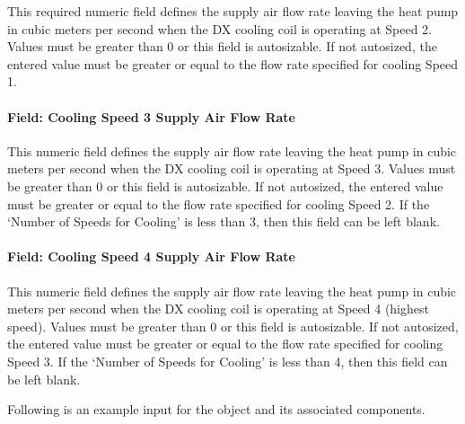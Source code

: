 This required numeric field defines the supply air flow rate leaving the heat pump in cubic meters per second when the DX cooling coil is operating at Speed 2. Values must be greater than 0 or this field is autosizable. If not autosized, the entered value must be greater or equal to the flow rate specified for cooling Speed 1.

\paragraph{Field: Cooling Speed 3 Supply Air Flow Rate}\label{field-cooling-speed-3-supply-air-flow-rate}

This numeric field defines the supply air flow rate leaving the heat pump in cubic meters per second when the DX cooling coil is operating at Speed 3. Values must be greater than 0 or this field is autosizable. If not autosized, the entered value must be greater or equal to the flow rate specified for cooling Speed 2. If the `Number of Speeds for Cooling' is less than 3, then this field can be left blank.

\paragraph{Field: Cooling Speed 4 Supply Air Flow Rate}\label{field-cooling-speed-4-supply-air-flow-rate}

This numeric field defines the supply air flow rate leaving the heat pump in cubic meters per second when the DX cooling coil is operating at Speed 4 (highest speed). Values must be greater than 0 or this field is autosizable. If not autosized, the entered value must be greater or equal to the flow rate specified for cooling Speed 3. If the `Number of Speeds for Cooling' is less than 4, then this field can be left blank.

Following is an example input for the object and its associated components.

